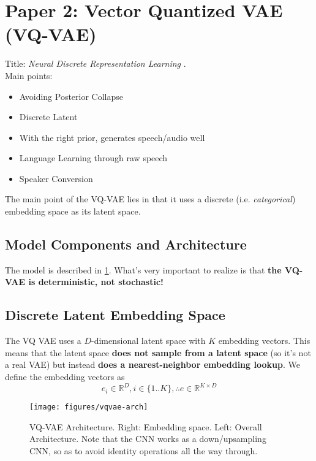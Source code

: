 \section{Paper 2: Vector Quantized VAE (VQ-VAE)}
Title:  \textit{Neural Discrete Representation Learning} \cite{oord_neural_2018}.
\\



Main points: 
\begin{itemize}
    \item Avoiding Posterior Collapse
    \item Discrete Latent
    \item With the right prior, generates speech/audio well  %
    \item Language Learning through raw speech
    \item Speaker Conversion
\end{itemize}


The main point of the VQ-VAE lies in that it uses a discrete (i.e. \textit{categorical}) embedding space as its latent space. 


\subsection{Model Components and Architecture}
The model is described in \cref{fig:vqvae-arch}.
What's very important to realize is that \textbf{the VQ-VAE is deterministic, not stochastic!}

\subsection{Discrete Latent Embedding Space}
The VQ VAE uses a \(D\)-dimensional latent space with \(K\) embedding vectors.
This means that the latent space \textbf{does not sample from a latent space} (so it's not a real VAE) but instead \textbf{does a nearest-neighbor embedding lookup}. 
We define the embedding vectors as 
\[
  e_i \in \mathbb{R}^D, i \in \{1 .. K\}, \therefore e \in \mathbb{R}^{K \times D}
\]

\begin{figure}[ht]
    \begin{small}
        \begin{center}
            \texttt{[image: figures/vqvae-arch]}
        \end{center}
        \caption{VQ-VAE Architecture. 
        Right: Embedding space. 
        Left: Overall Architecture. 
        Note that the CNN works as a down/upsampling CNN, so as to avoid identity operations all the way through. 
        }
        \label{fig:vqvae-arch}
    \end{small}
\end{figure}

